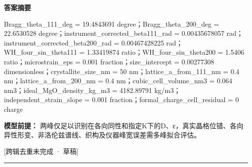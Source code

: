 \documentclass[UTF8,11pt,a4paper]{ctexart}
\begin{document}
\noindent\textbf{答案摘要}\par
Bragg\_theta\_111\_deg = 19.4843691 degree；Bragg\_theta\_200\_deg = 22.6530528 degree；instrument\_corrected\_beta111\_rad = 0.00435678057 rad；instrument\_corrected\_beta200\_rad = 0.00467428225 rad；WH\_four\_sin\_theta111 = 1.33419874 ratio；WH\_four\_sin\_theta200 = 1.5406 ratio；microstrain\_eps = 0.001 fraction；size\_intercept = 0.00277308 dimensionless；crystallite\_size\_nm = 50 nm；lattice\_a\_from\_111\_nm = 0.4 nm；lattice\_a\_from\_200\_nm = 0.4 nm；cubic\_cell\_volume\_nm3 = 0.064 nm3；ideal\_MgO\_density\_kg\_m3 = 4182.89791 kg/m3；independent\_strain\_slope = 0.001 fraction；formal\_charge\_cell\_residual = 0 charge\par
\noindent\textbf{模型前提：}
两峰仅足以识别在各向同性和指定K下的D、ε，真实晶格位错、各向异性形变、非洛伦兹谱线、织构及仪器峰宽误差需多峰拟合评估。\par
\noindent\textcolor{red!65!black}{[跨辑去重未完成 · 草稿]} \par
\medskip\hrule\medskip
{}
\end{document}

